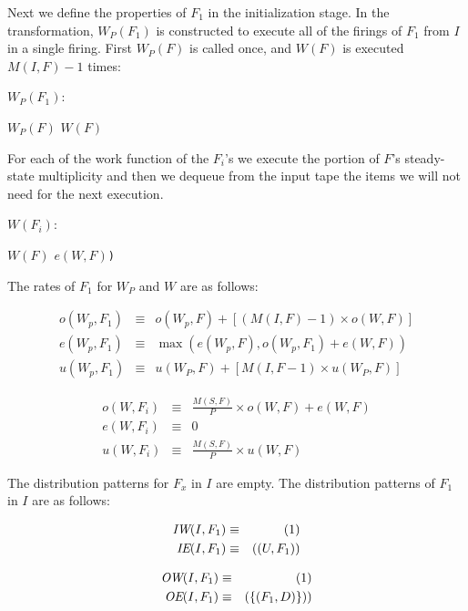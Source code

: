 Next we define the properties of $F_1$ in the initialization stage. In
the transformation, $W_P(F_1)$ is constructed to execute all of the
firings of $F_1$ from $I$ in a single firing.  First $W_P(F)$ is
called once, and $W(F)$ is executed $M(I,F) - 1$ times:

\begin{algorithm}
$W_P(F_1)$:
\begin{algorithmic}[1]
\State $W_P(F)$
\State $W(F)$
\EndFor
\end{algorithmic}
\end{algorithm}

For each of the work function of the $F_i$'s we execute the portion of
$F$'s steady-state multiplicity and then we dequeue from the input
tape the items we will not need for the next execution.  

\begin{algorithm}
$W(F_i)$:
\begin{algorithmic}[1]
\State $W(F)$
\EndFor
{}$e(W,F)${\tt)}
\end{algorithmic}
\end{algorithm}

The rates of $F_1$ for $W_P$ and $W$ are as follows:
 
\begin{eqnarray*} 
o(W_p,F_1) & \equiv & o(W_p,F) + [(M(I,F) - 1) \times o(W,F)] \\
e(W_p,F_1) & \equiv & \max(e(W_p,F), o(W_p,F_1) + e(W,F)) \\
u(W_p,F_1) & \equiv & u(W_P,F) + [M(I,F - 1) \times u(W_P,F)]
\end{eqnarray*} 

\begin{eqnarray*} 
o(W,F_i) & \equiv & \frac{M(S,F)}{P} \times o(W,F) + e(W,F)\\
e(W,F_i) & \equiv & 0 \\
u(W,F_i) & \equiv & \frac{M(S,F)}{P} \times u(W,F)
\end{eqnarray*} 

The distribution patterns for $F_x$ in $I$ are empty.  The
distribution patterns of $F_1$ in $I$ are as follows:

\begin{eqnarray*}
\mbox{\it IW}(I,F_1) & \equiv & (1) \\
\mbox{\it IE}(I,F_1) & \equiv & ((U,F_1)) 
\end{eqnarray*}

\begin{eqnarray*} 
\mbox{\it OW}(I,F_1) & \equiv & (1) \\
\mbox{\it OE}(I,F_1) & \equiv & (\{(F_1, D)\}))
\end{eqnarray*} 

